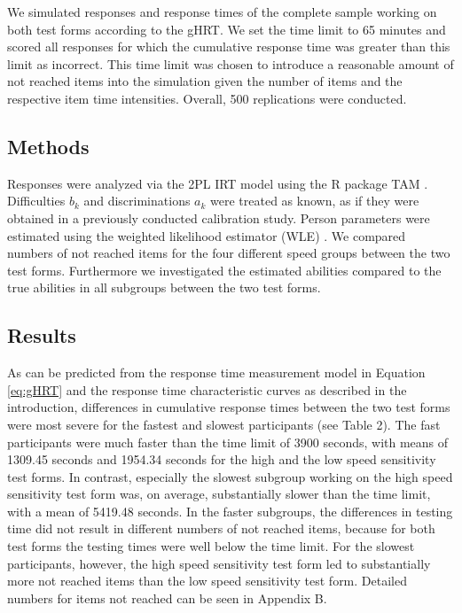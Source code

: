 \documentclass[a4paper,man,apacite,floatsintext,donotrepeattitle]{apa6}
\begin{document}
We simulated responses and response times of the complete sample working on both test forms according to the gHRT. We set the time limit to 65 minutes and scored all responses for which the cumulative response time was greater than this limit as incorrect. This time limit was chosen to introduce a reasonable amount of not reached items into the simulation given the number of items and the respective item time intensities. Overall, 500 replications were conducted. 

\subsection{Methods}
Responses were analyzed via the 2PL IRT model using the R package TAM \cite{Robitzsch.TAM}. Difficulties $b_{k}$ and discriminations $a_{k}$ were treated as known, as if they were obtained in a previously conducted calibration study. Person parameters were estimated using the weighted likelihood estimator (WLE) \cite{Warm.1989}. We compared numbers of not reached items for the four different speed groups between the two test forms. Furthermore we investigated the estimated abilities compared to the true abilities in all subgroups between the two test forms.

\subsection{Results}
As can be predicted from the response time measurement model in Equation \ref{eq:gHRT} and the response time characteristic curves as described in the introduction, differences in cumulative response times between the two test forms were most severe for the fastest and slowest participants (see Table 2). The fast participants were much faster than the time limit of 3900 seconds, with means of 1309.45 seconds and 1954.34 seconds for the high and the low speed sensitivity test forms. In contrast, especially the slowest subgroup working on the high speed sensitivity test form was, on average, substantially slower than the time limit, with a mean of 5419.48 seconds. In the faster subgroups, the differences in testing time did not result in different numbers of not reached items, because for both test forms the testing times were well below the time limit. For the slowest participants, however, the high speed sensitivity test form led to substantially more not reached items than the low speed sensitivity test form. Detailed numbers for items not reached can be seen in Appendix B. 
\end{document}
